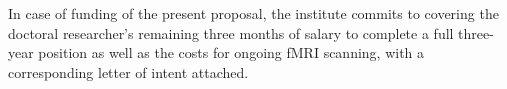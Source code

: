 \documentclass[11pt,a4paper]{article}
\begin{document}
In case of funding of the present proposal, the institute commits to covering the doctoral researcher's remaining three 
months of salary to complete a full three-year position as well as the costs for ongoing fMRI scanning, 
with a corresponding letter of intent attached.\\

\newpage

\printbibliography
\end{document}
